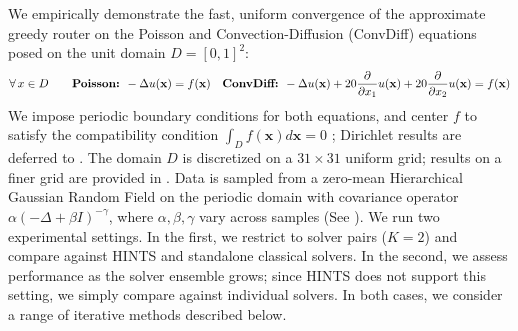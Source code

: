 \documentclass{article}
\begin{document}
We empirically demonstrate the fast, uniform convergence of the approximate greedy router on the Poisson and Convection-Diffusion (ConvDiff) equations posed on the unit domain $D = [0, 1]^2$:
\begin{equation*}
    \forall\, x\in D \qquad
    \text{\textbf{Poisson:} } - \Delta u(\mathbf{x}) = f(\mathbf{x})
    \quad
    \text{\textbf{ConvDiff:} } -\Delta u(\mathbf{x}) + 20\frac{\partial}{\partial x_1}u(\mathbf{x}) + 20\frac{\partial}{\partial x_2}u(\mathbf{x}) = f(\mathbf{x})
\end{equation*}
We impose periodic boundary conditions for both equations, and center $f$ to satisfy the compatibility condition $\int_D f(\mathbf{x})d\mathbf{x} = 0$
; Dirichlet results are deferred to 
. The domain $D$ is discretized on a $31 \times 31$ uniform grid; results on a finer grid are provided in . Data is sampled from a zero-mean Hierarchical Gaussian Random Field on the periodic domain with covariance operator $\alpha(- \Delta + \beta I)^{-\gamma}$, where $\alpha, \beta, \gamma$ vary across samples (See ).  We run two experimental settings. 
In the first, we restrict to solver pairs ($K = 2$) and compare against HINTS and standalone classical solvers. In the second, we assess performance as the solver ensemble grows; since HINTS does not support this setting, we simply compare against individual solvers. 
In both cases, we consider a range of iterative methods described below.
\end{document}
